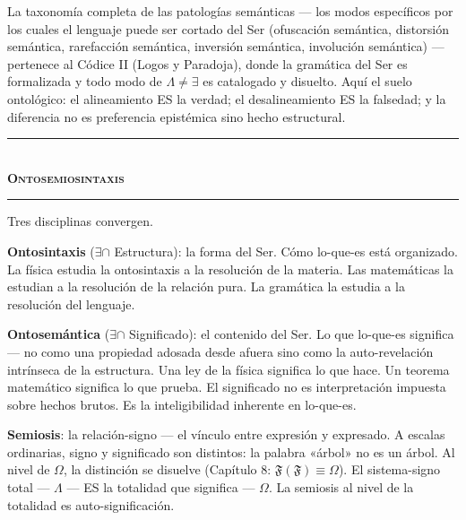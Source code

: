 \documentclass[10pt, openany, oneside]{book}
\renewcommand{\normalsize}{\fontsize{10}{13}\selectfont}
\begin{document}
La taxonomía completa de las patologías semánticas --- los modos específicos por los cuales el lenguaje puede ser cortado del Ser (ofuscación semántica, distorsión semántica, rarefacción semántica, inversión semántica, involución semántica) --- pertenece al Códice II (Logos y Paradoja), donde la gramática del Ser es formalizada y todo modo de $\Lambda \neq \exists$ es catalogado y disuelto. Aquí el suelo ontológico: el alineamiento ES la verdad; el desalineamiento ES la falsedad; y la diferencia no es preferencia epistémica sino hecho estructural.

\vspace{1.5em}


\begin{center}
    \rule{0.3\textwidth}{0.4pt}\\[0.5em]
    {\normalsize\bfseries\scshape Ontosemiosintaxis}\\[0.3em]
    \rule{0.3\textwidth}{0.4pt}
\end{center}

\vspace{1em}

\noindent Tres disciplinas convergen.

\textbf{Ontosintaxis} ($\exists \cap$ Estructura): la forma del Ser. Cómo lo-que-es está organizado. La física estudia la ontosintaxis a la resolución de la materia. Las matemáticas la estudian a la resolución de la relación pura. La gramática la estudia a la resolución del lenguaje.

\textbf{Ontosemántica} ($\exists \cap$ Significado): el contenido del Ser. Lo que lo-que-es significa --- no como una propiedad adosada desde afuera sino como la auto-revelación intrínseca de la estructura. Una ley de la física significa lo que hace. Un teorema matemático significa lo que prueba. El significado no es interpretación impuesta sobre hechos brutos. Es la inteligibilidad inherente en lo-que-es.

\textbf{Semiosis}: la relación-signo --- el vínculo entre expresión y expresado. A escalas ordinarias, signo y significado son distintos: la palabra «árbol» no es un árbol. Al nivel de $\Omega$, la distinción se disuelve (Capítulo 8: $\mathfrak{F}(\mathfrak{F}) \equiv \Omega$). El sistema-signo total --- $\Lambda$ --- ES la totalidad que significa --- $\Omega$. La semiosis al nivel de la totalidad es auto-significación.
\end{document}
